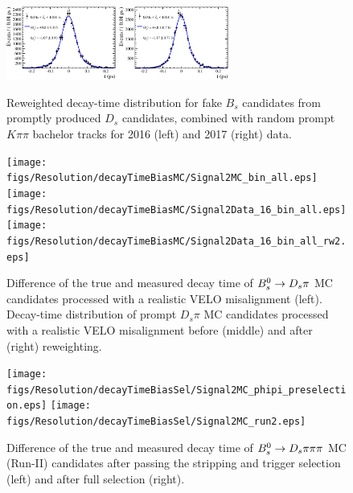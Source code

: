 \begin{figure}[h]
\centering
	\includegraphics[width=0.32\textwidth, height = !]{figs/Resolution/decayTimeBias/Signal2Data_16_bin_all.eps} 
	\includegraphics[width=0.32\textwidth, height = !]{figs/Resolution/decayTimeBias/Signal2Data_17_bin_all.eps} 
\caption{Reweighted decay-time distribution for fake $B_s$ candidates from promptly produced $D_s$ candidates, combined with random prompt $K\pi\pi$ bachelor tracks 
for 2016 (left) and 2017 (right) data. }
\label{fig:decayTimeBiasData}
\end{figure}

\begin{figure}[h]
\centering
	\texttt{[image: figs/Resolution/decayTimeBiasMC/Signal2MC\_bin\_all.eps]} 
	\texttt{[image: figs/Resolution/decayTimeBiasMC/Signal2Data\_16\_bin\_all.eps]} 
	\texttt{[image: figs/Resolution/decayTimeBiasMC/Signal2Data\_16\_bin\_all\_rw2.eps]} 
\caption{ Difference of the true and measured decay time of ${{B}^0_{s}}\rightarrow{\ensuremath{{D}_{s}}}{\ensuremath{\pi}}$ MC candidates processed with a realistic VELO misalignment (left).
Decay-time distribution of prompt $D_s \pi$ MC candidates processed with a realistic VELO misalignment before (middle) and after (right) reweighting.
  }
\label{fig:decayTimeBiasMC}
\end{figure}



\begin{figure}[h]
\centering
	\texttt{[image: figs/Resolution/decayTimeBiasSel/Signal2MC\_phipi\_preselection.eps]} 
	\texttt{[image: figs/Resolution/decayTimeBiasSel/Signal2MC\_run2.eps]} 
\caption{Difference of the true and measured decay time of ${{B}^0_{s}}\rightarrow{\ensuremath{{D}_{s}}} \pi\pi\pi$ MC (Run-II) candidates after passing the stripping and trigger selection (left) and after full selection (right).}
\label{fig:biasSel}
\end{figure}


